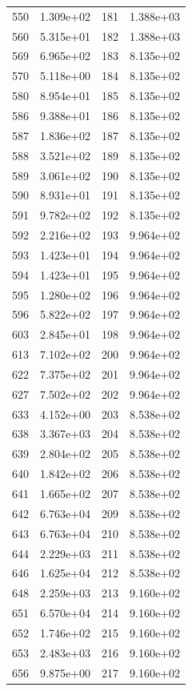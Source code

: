 \documentclass[12pt]{article}
\begin{document}
\begin{longtable}{@{}cccc@{}}
550 & 1.309e+02 & 181 & 1.388e+03 \\
560 & 5.315e+01 & 182 & 1.388e+03 \\
569 & 6.965e+02 & 183 & 8.135e+02 \\
570 & 5.118e+00 & 184 & 8.135e+02 \\
580 & 8.954e+01 & 185 & 8.135e+02 \\
586 & 9.388e+01 & 186 & 8.135e+02 \\
587 & 1.836e+02 & 187 & 8.135e+02 \\
588 & 3.521e+02 & 189 & 8.135e+02 \\
589 & 3.061e+02 & 190 & 8.135e+02 \\
590 & 8.931e+01 & 191 & 8.135e+02 \\
591 & 9.782e+02 & 192 & 8.135e+02 \\
592 & 2.216e+02 & 193 & 9.964e+02 \\
593 & 1.423e+01 & 194 & 9.964e+02 \\
594 & 1.423e+01 & 195 & 9.964e+02 \\
595 & 1.280e+02 & 196 & 9.964e+02 \\
596 & 5.822e+02 & 197 & 9.964e+02 \\
603 & 2.845e+01 & 198 & 9.964e+02 \\
613 & 7.102e+02 & 200 & 9.964e+02 \\
622 & 7.375e+02 & 201 & 9.964e+02 \\
627 & 7.502e+02 & 202 & 9.964e+02 \\
633 & 4.152e+00 & 203 & 8.538e+02 \\
638 & 3.367e+03 & 204 & 8.538e+02 \\
639 & 2.804e+02 & 205 & 8.538e+02 \\
640 & 1.842e+02 & 206 & 8.538e+02 \\
641 & 1.665e+02 & 207 & 8.538e+02 \\
642 & 6.763e+04 & 209 & 8.538e+02 \\
643 & 6.763e+04 & 210 & 8.538e+02 \\
644 & 2.229e+03 & 211 & 8.538e+02 \\
646 & 1.625e+04 & 212 & 8.538e+02 \\
648 & 2.259e+03 & 213 & 9.160e+02 \\
651 & 6.570e+04 & 214 & 9.160e+02 \\
652 & 1.746e+02 & 215 & 9.160e+02 \\
653 & 2.483e+03 & 216 & 9.160e+02 \\
656 & 9.875e+00 & 217 & 9.160e+02 \\

\end{longtable}
\end{document}
